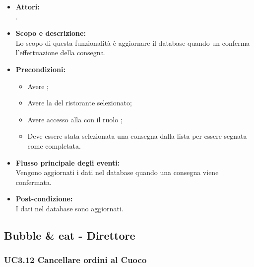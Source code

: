 \begin{itemize}
	\item \textbf{Attori:}
	\\.
	\item \textbf{Scopo e descrizione:} 
	\\Lo scopo di questa funzionalità è aggiornare il database quando un  conferma l'effettuazione della consegna.
	\item \textbf{Precondizioni:}
	\begin{itemize}
		\item Avere ;
		\item Avere la  del ristorante selezionato;
		\item Avere accesso alla  con il ruolo ;
		\item Deve essere stata selezionata una consegna dalla lista per essere segnata come completata.
	\end{itemize}
	\item \textbf{Flusso principale degli eventi:}
	\\Vengono aggiornati i dati nel database quando una consegna viene confermata.
	\item \textbf{Post-condizione:}
	\\I dati nel database sono aggiornati.
\end{itemize}

\subsection{Bubble \& eat - Direttore}

\subsubsection{UC3.12 Cancellare ordini al Cuoco} \label{UC3.12}

